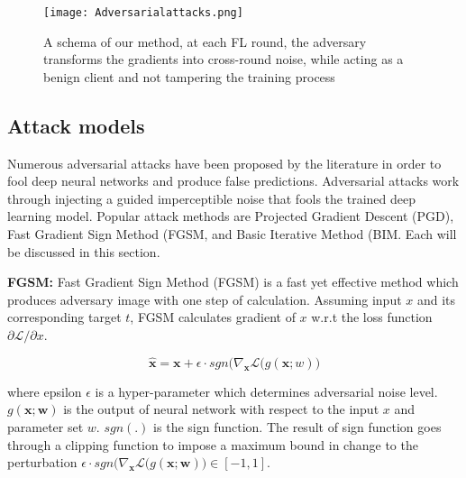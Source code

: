 

\begin{figure}[t!]
 \centering
 \texttt{[image: Adversarialattacks.png]}
 \caption{A schema of our method, at each FL round, the adversary transforms the gradients into cross-round noise, while acting as a benign client and not tampering the training process}
 \label{fig:pgd-atta-comparison}
\end{figure}

\subsection{Attack models}
Numerous adversarial attacks have been proposed by the literature in order to fool deep neural networks and produce false predictions. Adversarial attacks work through injecting a guided imperceptible noise that fools the trained deep learning model. Popular attack methods are Projected Gradient Descent (PGD), Fast Gradient Sign Method (FGSM, and Basic Iterative Method (BIM. Each will be discussed in this section.

\textbf{FGSM:} Fast Gradient Sign Method (FGSM) \cite{szegedy2013intriguing}is a fast yet effective method which produces adversary image with one step of calculation. Assuming input $x$ and its corresponding target $t$, FGSM calculates gradient of $x$ w.r.t the loss function ${\partial \mathcal{L}}/ \partial {x}$.

\begin{equation}
\label{eqt:fgsm}
    \bm{\hat{x}} = \bm{x} + \epsilon \cdot sgn\big(\nabla_{\bm{x}}{\mathcal{L}}(g(\bm{x};w)\big)
\end{equation}

where epsilon $\epsilon$ is a hyper-parameter which determines adversarial noise level. $g(\bm{x};\bm{w})$ is the output of neural network with respect to the input $x$ and parameter set $w$. $sgn(.)$ is the sign function. The result of sign function goes through a clipping function to impose a maximum bound in change to the perturbation $\epsilon \cdot sgn\big(\nabla_{\bm{x}}{\mathcal{L}}(g(\bm{x};\bm{w})\big)\in [-1,1]$.


